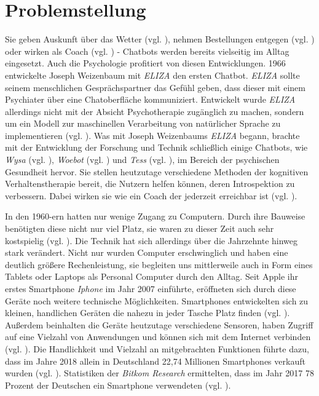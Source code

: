 
\section{Problemstellung}
\label{ch:Problemstellung}


Sie geben Auskunft über das Wetter (vgl. \cite{GoogleAl38:online}), nehmen Bestellungen entgegen (vgl. \cite{KassenSc50:online}) oder wirken als Coach (vgl. \cite{Wysayour57:online}) - Chatbots werden bereits vielseitig im Alltag eingesetzt. Auch die Psychologie profitiert von diesen Entwicklungen. 1966 entwickelte Joseph Weizenbaum mit \emph{ELIZA} den ersten Chatbot. \emph{ELIZA} sollte seinem menschlichen Gesprächspartner das Gefühl geben, dass dieser mit einem Psychiater über eine Chatoberfläche kommuniziert. Entwickelt wurde \emph{ELIZA} allerdings nicht mit der Absicht  Psychotherapie zugänglich zu machen, sondern um ein Modell zur maschinellen Verarbeitung von natürlicher Sprache zu implementieren (vgl. \cite{Weizenbaum1966}). Was mit Joseph Weizenbaums \emph{ELIZA} begann, brachte mit der Entwicklung der Forschung und Technik schließlich einige Chatbots, wie \emph{Wysa} (vgl. \cite{Wysayour57:online}), \emph{Woebot} (vgl. \cite{WoebotYo93:online}) und \emph{Tess} (vgl. \cite{TessArti99:online}), im Bereich der psychischen Gesundheit hervor. Sie stellen heutzutage verschiedene Methoden der kognitiven Verhaltenstherapie bereit, die Nutzern helfen können, deren Introspektion zu verbessern. Dabei wirken sie wie ein Coach der jederzeit erreichbar ist (vgl. \cite{Fitzpatrick2017}).  

In den 1960-ern hatten nur wenige Zugang zu Computern. Durch ihre Bauweise benötigten diese nicht nur viel Platz, sie waren zu dieser Zeit auch sehr kostspielig (vgl. \cite{SWB-11524946X}). Die Technik hat sich allerdings über die Jahrzehnte hinweg stark verändert. Nicht nur wurden Computer erschwinglich und haben eine deutlich größere Rechenleistung, sie begleiten uns mittlerweile auch in Form eines Tablets oder Laptops als Personal Computer durch den Alltag. Seit Apple ihr erstes Smartphone \emph{Iphone} im Jahr 2007 einführte, eröffneten sich durch diese Geräte noch weitere technische Möglichkeiten. Smartphones entwickelten sich zu kleinen, handlichen Geräten die nahezu in jeder Tasche Platz finden (vgl. \cite{SWB-481290869}). Außerdem beinhalten die Geräte heutzutage verschiedene Sensoren, haben Zugriff auf eine Vielzahl von Anwendungen und können sich mit dem Internet verbinden (vgl. \cite{SWB-481290869}\cite{AppStore21:online}). Die Handlichkeit und Vielzahl an mitgebrachten Funktionen führte dazu, dass im Jahre 2018 allein in Deutschland 22,74 Millionen Smartphones verkauft wurden (vgl. \cite{Zukunftd37:online}). Statistiken der \emph{Bitkom Research} ermittelten, dass im Jahr 2017 78 Prozent der Deutschen ein Smartphone verwendeten (vgl. \cite{Smartpho6:online}).

